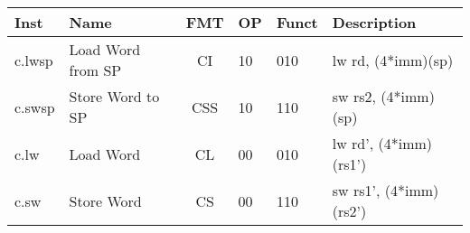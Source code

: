 \begin{center}
\begin{tabular}
{T | l | c | T | T | T } \hline
\rm Inst   & Name                    & FMT & \rm OP & \rm Funct & \rm Description          \\ \hline
c.lwsp     & Load Word from SP       & CI  & 10     & 010       & lw rd, (4*imm)(sp)       \\
c.swsp     & Store Word to SP        & CSS & 10     & 110       & sw rs2, (4*imm)(sp)      \\
c.lw       & Load Word               & CL  & 00     & 010       & lw rd', (4*imm)(rs1')    \\
c.sw       & Store Word              & CS  & 00     & 110       & sw rs1', (4*imm)(rs2')    \\

\end{tabular}
\end{center}
